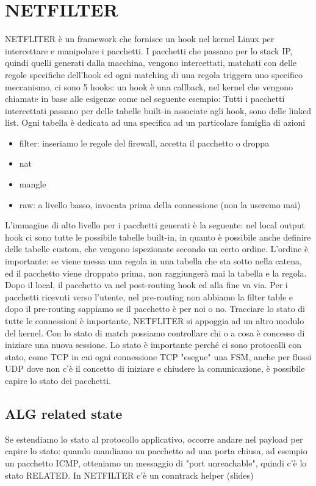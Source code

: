\documentclass[12pt, oneside]{extbook} %
\begin{document}
\section{NETFILTER}
NETFLITER è un framework che fornisce un hook nel kernel Linux per intercettare e manipolare i pacchetti. I pacchetti che passano per lo stack IP, quindi quelli generati dalla macchina, vengono intercettati, matchati con delle regole specifiche dell'hook ed ogni matching di una regola triggera uno specifico meccanismo, ci sono 5 hooks: un hook è una callback, nel kernel che vengono chiamate in base alle esigenze come nel seguente esempio:
Tutti i pacchetti intercettati passano per delle tabelle built-in associate agli hook, sono delle linked list. Ogni tabella è dedicata ad una specifica ad un particolare famiglia di azioni
\begin{itemize}
\item filter: inseriamo le regole del firewall, accetta il pacchetto o droppa
\item nat
\item mangle
\item raw: a livello basso, invocata prima della connessione (non la useremo mai)
\end{itemize}
L'immagine di alto livello per i pacchetti generati è la seguente: nel local output hook ci sono tutte le possibile tabelle built-in, in quanto è possibile anche definire delle tabelle custom, che vengono ispezionate secondo un certo ordine. L'ordine è importante: se viene messa una regola in una tabella che sta sotto nella catena, ed il pacchetto viene droppato prima, non raggiungerà mai la tabella e la regola.\\ Dopo il local, il pacchetto va nel post-routing hook ed alla fine va via.
Per i pacchetti ricevuti verso l'utente, nel pre-routing non abbiamo la filter table e dopo il pre-routing sappiamo se il pacchetto è per noi o no.
Tracciare lo stato di tutte le connessioni è importante, NETFLITER si appoggia ad un altro modulo del kernel. Con lo stato di match possiamo controllare chi o a cosa è concesso di iniziare una nuova sessione. Lo stato è importante perché ci sono protocolli con stato, come TCP in cui ogni connessione TCP "esegue" una FSM, anche per flussi UDP dove non c'è il concetto di iniziare e chiudere la comunicazione, è possibile capire lo stato dei pacchetti.
\subsection{ALG related state}
Se estendiamo lo stato al protocollo applicativo, occorre andare nel payload per capire lo stato: quando mandiamo un pacchetto ad una porta chiusa, ad esempio un pacchetto ICMP, otteniamo un messaggio di "port unreachable", quindi c'è lo stato RELATED. In NETFILTER c'è un conntrack helper (slides)
\end{document}
